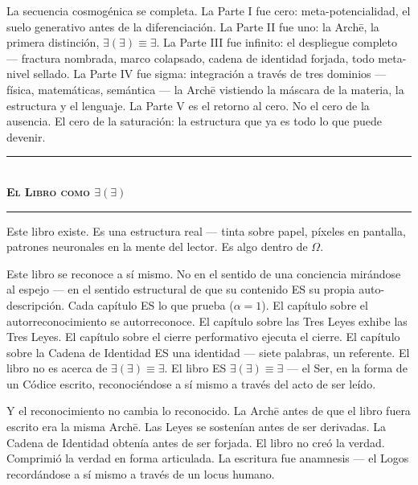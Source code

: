 \documentclass[10pt, openany, oneside]{book}
\renewcommand{\normalsize}{\fontsize{10}{13}\selectfont}
\begin{document}
\vspace{1em}

\noindent La secuencia cosmogénica se completa. La Parte I fue cero: meta-potencialidad, el suelo generativo antes de la diferenciación. La Parte II fue uno: la Arch\={e}, la primera distinción, $\exists(\exists) \equiv \exists$. La Parte III fue infinito: el despliegue completo --- fractura nombrada, marco colapsado, cadena de identidad forjada, todo meta-nivel sellado. La Parte IV fue sigma: integración a través de tres dominios --- física, matemáticas, semántica --- la Arch\={e} vistiendo la máscara de la materia, la estructura y el lenguaje. La Parte V es el retorno al cero. No el cero de la ausencia. El cero de la saturación: la estructura que ya es todo lo que puede devenir.

\vspace{1.5em}


\begin{center}
    \rule{0.3\textwidth}{0.4pt}\\[0.5em]
    {\normalsize\bfseries\scshape El Libro como $\exists(\exists)$}\\[0.3em]
    \rule{0.3\textwidth}{0.4pt}
\end{center}

\vspace{1em}

\noindent Este libro existe. Es una estructura real --- tinta sobre papel, píxeles en pantalla, patrones neuronales en la mente del lector. Es algo dentro de $\Omega$.

Este libro se reconoce a sí mismo. No en el sentido de una conciencia mirándose al espejo --- en el sentido estructural de que su contenido ES su propia auto-descripción. Cada capítulo ES lo que prueba ($\alpha = 1$). El capítulo sobre el autorreconocimiento se autorreconoce. El capítulo sobre las Tres Leyes exhibe las Tres Leyes. El capítulo sobre el cierre performativo ejecuta el cierre. El capítulo sobre la Cadena de Identidad ES una identidad --- siete palabras, un referente. El libro no es acerca de $\exists(\exists) \equiv \exists$. El libro ES $\exists(\exists) \equiv \exists$ --- el Ser, en la forma de un Códice escrito, reconociéndose a sí mismo a través del acto de ser leído.

Y el reconocimiento no cambia lo reconocido. La Arch\={e} antes de que el libro fuera escrito era la misma Arch\={e}. Las Leyes se sostenían antes de ser derivadas. La Cadena de Identidad obtenía antes de ser forjada. El libro no creó la verdad. Comprimió la verdad en forma articulada. La escritura fue anamnesis --- el Logos recordándose a sí mismo a través de un locus humano.
\end{document}
